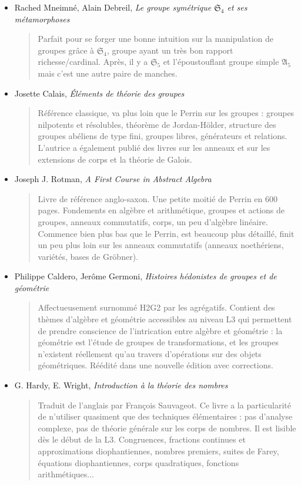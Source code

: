 \documentclass{article}
\begin{document}
\begin{itemize}
\item Rached Mneimné, Alain Debreil, \emph{Le groupe symétrique $\mathfrak S_4$ et ses métamorphoses}
\begin{quote}
Parfait pour se forger une bonne intuition sur la manipulation de groupes grâce à $\mathfrak S_4$, groupe ayant un très bon rapport richesse/cardinal.  Après, il y a $\mathfrak S_5$ et l'époustouflant groupe simple $\mathfrak A_5$ mais c'est une autre paire de manches.
\end{quote}
\item Josette Calais, \emph{Éléments de théorie des groupes}
\begin{quote}
Référence classique, va plus loin que le Perrin sur les groupes : groupes nilpotents et résolubles, théorème de Jordan-Hölder, structure des groupes abéliens de type fini, groupes libres, générateurs et relations.  L'autrice a également publié des livres sur les anneaux et sur les extensions de corps et la théorie de Galois.
\end{quote}
\item Joseph J. Rotman, \emph{A First Course in Abstract Algebra}
\begin{quote}
Livre de référence anglo-saxon. Une petite moitié de Perrin en 600 pages. Fondements en algèbre et arithmétique, groupes et actions de groupes, anneaux commutatifs, corps, un peu d'algèbre linéaire. Commence bien plus bas que le Perrin, est beaucoup plus détaillé, finit un peu plus loin sur les anneaux commutatifs (anneaux noethériens, variétés, bases de Gröbner).
\end{quote}

\item Philippe Caldero, Jerôme Germoni, \emph{Histoires hédonistes de groupes et de géométrie}
\begin{quote}
Affectueusement surnommé \og H2G2\fg{} par les agrégatifs. Contient des thèmes d'algèbre et géométrie accessibles au niveau L3 qui permettent de prendre conscience de l'intrication entre algèbre et géométrie : la géométrie est l'étude de groupes de transformations, et les groupes n'existent réellement qu'au travers d'opérations sur des objets géométriques. Réédité dans une nouvelle édition avec corrections.
\end{quote}
\item G. Hardy, E. Wright, \emph{Introduction à la théorie des nombres}
\begin{quote}
Traduit de l'anglais par François Sauvageot. Ce livre a la particularité de n'utiliser quasiment que des techniques élémentaires : pas d'analyse complexe, pas de théorie générale sur les corps de nombres. Il est lisible  dès le début de la L3. Congruences, fractions continues et approximations diophantiennes, nombres premiers, suites de Farey, équations diophantiennes, corps quadratiques, fonctions arithmétiques...
\end{quote}

\end{itemize}
\end{document}
